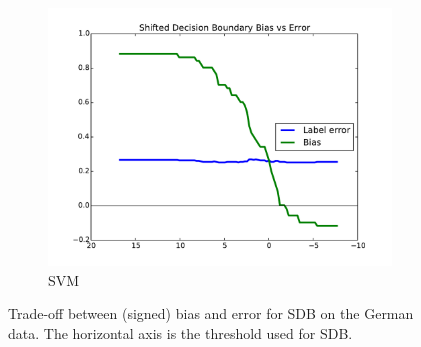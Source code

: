 \documentclass[conference]{IEEEtran}
\begin{document}
\begin{figure}[t]
\begin{subfigure}{.7\columnwidth}
\includegraphics[width=\columnwidth]{images/german-svmlinear-T.pdf}%
\caption{SVM}%
\label{fig:german_svm_tradeoff}%
\end{subfigure}%
\caption{Trade-off between (signed) bias and error for SDB on the German data. The horizontal axis is the threshold used for SDB.}
\label{fig:german_tradeoffs}
\end{figure}
\end{document}
